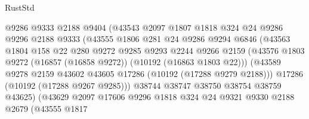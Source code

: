 \begin{lexlean}{RustStd}
\begin{coremodule}
                            @9286
                            @9333
                            @2188
                            @9404
                            (@43543
                              @2097
                              @1807
                              @1818
                              @324
                              @24
                              @9286
                              @9296
                              @2188
                              @9333
                              (@43555
                                @1806
                                @281
                                @24
                                @9286
                                @9294
                                @6846
                                (@43563
                                  @1804
                                  @158
                                  @22
                                  @280
                                  @9272
                                  @9285
                                  @9293
                                  @2244
                                  @9266
                                  @2159
                                  (@43576
                                    @1803
                                    @9272
                                    (@16857 (@16858 @9272))
                                    (@10192 (@16863 @1803 @22)))
                                  (@43589
                                    @9278
                                    @2159
                                    @43602
                                    @43605
                                    @17286
                                    (@10192 (@17288 @9279 @2188)))
                                  @17286
                                  (@10192 (@17288 @9267 @9285)))
                                @38744
                                @38747
                                @38750
                                @38754
                                @38759
                                @43625)
                              (@43629
                                @2097
                                @17606
                                @9296
                                @1818
                                @324
                                @24
                                @9321
                                @9330
                                @2188
                                @2679
                                (@43555
                                  @1817

\end{coremodule}
\end{lexlean}
